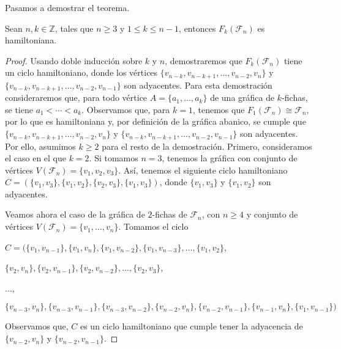 Pasamos a demostrar el teorema.
    
\begin{teorema}
\label{teo:hamilt-SFan}
    Sean $n,k \in \mathbb{Z}$, tales que $n \geq 3$ y $1 \leq k \leq n-1$,
    entonces $F_k(\mathcal{F}_n)$ es hamiltoniana.
\end{teorema}
    
\begin{proof}
    Usando doble inducci\'on sobre $k$ y $n$, demostraremos que
    $F_k(\mathcal{F}_n)$ tiene un ciclo hamiltoniano, donde los v\'ertices
    $\{v_{n-k}, v_{n-k+1}, \dots, v_{n-2}, v_n\}$ y $\{v_{n-k}, v_{n-k+1},
    \dots, v_{n-2}, v_{n-1}\}$ son adyacentes. Para esta demostraci\'on
    consideraremos que, para todo v\'ertice $A = \{a_1, \dots, a_k\}$ de una
    gr\'afica de $k$-fichas, se tiene $a_1 < \cdots < a_k$. Observamos que, para
    $k =1$, tenemos que $F_1(\mathcal{F}_n) \cong \mathcal{F}_n$, por lo que es
    hamiltoniana y, por definici\'on de la gr\'afica abanico, se cumple que
    $\{v_{n-k}, v_{n-k+1}, \dots, v_{n-2}, v_n\}$ y $\{v_{n-k}, v_{n-k+1},
    \dots, v_{n-2}, v_{n-1}\}$ son adyacentes. Por ello, asumimos $k \geq 2$
    para el resto de la demostraci\'on. Primero, consideramos el caso en el que
    $k =2$. Si tomamos $n = 3$, tenemos la gr\'afica con conjunto de v\'ertices
    $V(\mathcal{F}_n)=\{v_1, v_2, v_3\}$. As\'i, tenemos el siguiente ciclo
    hamiltoniano $C= (\{v_1,v_3\},\{v_1,v_2\},\{v_2,v_3\}, \{v_1,v_3\})$, donde
    $\{v_1, v_3\}$ y $\{v_1, v_2\}$ son adyacentes. 
            
    Veamos ahora el caso de la gr\'afica de $2$-fichas de $\mathcal{F}_n$, con
    $n \geq 4$ y conjunto de v\'ertices $V(\mathcal{F}_n)=\{v_1,\dots, v_n\}$.
    Tomamos el ciclo
    
    \noindent
    $C = (\{v_1, v_{n-1}\},\{v_1, v_n\},\{v_1, v_{n-2}\}, \{v_1, v_{n-3}\},
    \dots, \{v_1, v_2\}$,
    
    \noindent
    $\{v_2, v_n\}, \{v_2, v_{n-1}\}, \{v_2, v_{n-2}\}, \dots, \{v_2,v_3\}$,
    
    \noindent
    $ \dots$,
    
    \noindent
    $\{v_{n-3},v_n\}, \{v_{n-3}, v_{n-1}\},\{v_{n-3},v_{n-2}\}, \{v_{n-2},
    v_n\},\{v_{n-2}, v_{n-1}\}, \{v_{n-1}, v_n\}, \{v_1, v_{n-1}\})$
    
    Observamos que, $C$ es un ciclo hamiltoniano que cumple tener la adyacencia
    de  $\{v_{n-2}, v_n\}$ y $\{v_{n-2}, v_{n-1}\}$. 
    

\end{proof}
